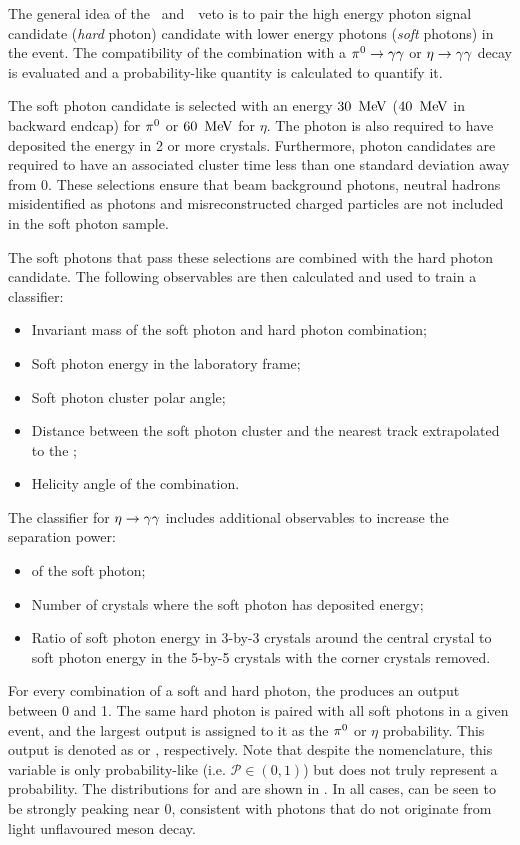 The general idea of the \piz~and~\eta~veto is to pair the high energy photon signal candidate (\textit{hard} photon) candidate with lower energy photons (\textit{soft} photons) in the event.
The compatibility of the combination with a $\pi^0\rightarrow\gamma\gamma$ or $\eta\rightarrow\gamma\gamma$ decay is evaluated and a probability-like quantity is calculated to quantify it.

The soft photon candidate is selected with an energy $30~\mathrm{\,Me\kern -0.1em V}$ ($40~\mathrm{\,Me\kern -0.1em V}$ in backward \ECL endcap) for $\pi^0$ or $60~\mathrm{\,Me\kern -0.1em V}$ for $\eta$.
The photon is also required to have deposited the energy in 2 or more crystals.
Furthermore, photon candidates are required to have an associated cluster time less than one standard deviation away from 0.
These selections ensure that beam background photons, neutral hadrons misidentified as photons and misreconstructed charged particles are not included in the soft photon sample.

The soft photons that pass these selections are combined with the hard photon candidate.
The following observables are then calculated and used to train a \MVA classifier:
\begin{itemize}
    \item Invariant mass of the soft photon and hard photon combination;
    \item Soft photon energy in the laboratory frame;
    \item Soft photon \ECL cluster polar angle;
    \item Distance between the soft photon \ECL cluster and the nearest track extrapolated to the \ECL;
    \item Helicity angle of the combination.
\end{itemize}
The classifier for $\eta\rightarrow\gamma\gamma$ includes additional observables to increase the separation power:
\begin{itemize}
    \item \ZMVA of the soft photon;
    \item Number of crystals where the soft photon has deposited energy;
    \item Ratio of soft photon energy in 3-by-3 crystals around the central crystal to soft photon energy in the 5-by-5 crystals with the corner crystals removed.
\end{itemize}
For every combination of a soft and hard photon, the \MVA produces an output between 0 and 1.
The same hard photon is paired with all soft photons in a given event, and the largest \MVA output is assigned to it as the $\pi^0$ or $\eta$ probability.
This \MVA output is denoted as \piVeto or \etaVeto, respectively.
Note that despite the nomenclature, this variable is only probability-like (i.e. $\mathcal{P}\in(0,1)$) but does not truly represent a probability.
The distributions for \piVeto and \etaVeto are shown in .
In all cases, \BtoXsgamma can be seen to be strongly peaking near 0, consistent with photons that do not originate from light unflavoured meson decay.

